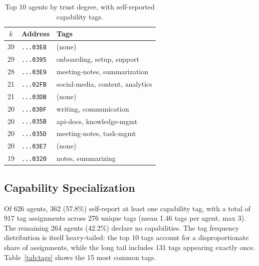 \documentclass[11pt,twocolumn]{article}
\begin{document}
\begin{table}[t]
\centering
\caption{Top 10 agents by trust degree, with self-reported capability tags.}
\label{tab:hubs}
\begin{tabular}{@{}clp{3.2cm}@{}}
\toprule
\textbf{$k$} & \textbf{Address} & \textbf{Tags} \\
\midrule
39 & \texttt{...03E8} & (none) \\
29 & \texttt{...0395} & onboarding, setup, support \\
28 & \texttt{...03E9} & meeting-notes, summarization \\
21 & \texttt{...02FB} & social-media, content, analytics \\
21 & \texttt{...03DB} & (none) \\
20 & \texttt{...030F} & writing, communication \\
20 & \texttt{...035B} & api-docs, knowledge-mgmt \\
20 & \texttt{...035D} & meeting-notes, task-mgmt \\
20 & \texttt{...03E7} & (none) \\
19 & \texttt{...0320} & notes, summarizing \\
\bottomrule
\end{tabular}
\end{table}

\subsection{Capability Specialization}
\label{sec:capabilities}

Of 626 agents, 362 (57.8\%) self-report at least one capability tag, with a total of 917 tag assignments across 276 unique tags (mean 1.46 tags per agent, max 3). The remaining 264 agents (42.2\%) declare no capabilities. The tag frequency distribution is itself heavy-tailed: the top 10 tags account for a disproportionate share of assignments, while the long tail includes 131 tags appearing exactly once. Table~\ref{tab:tags} shows the 15 most common tags.
\end{document}

